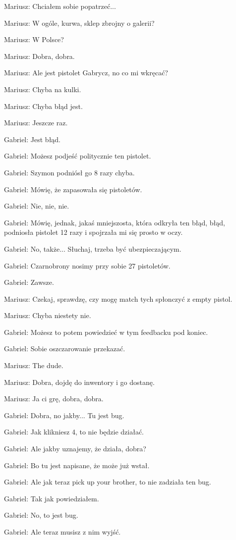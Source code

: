 Mariusz: Chciałem sobie popatrzeć...

Mariusz: W ogóle, kurwa, sklep zbrojny o galerii?

Mariusz: W Polsce?

Mariusz: Dobra, dobra.

Mariusz: Ale jest pistolet Gabrycz, no co mi wkręcać?

Mariusz: Chyba na kulki.

Mariusz: Chyba błąd jest.

Mariusz: Jeszcze raz.

Gabriel: Jest błąd.

Gabriel: Możesz podjeść politycznie ten pistolet.

Gabriel: Szymon podniósł go 8 razy chyba.

Gabriel: Mówię, że zapasowała się pistoletów.

Gabriel: Nie, nie, nie.

Gabriel: Mówię, jednak, jakaś mniejszosta, która odkryła ten błąd, błąd, podniosła pistolet 12 razy i spojrzała mi się prosto w oczy.

Gabriel: No, także... Słuchaj, trzeba być ubezpieczającym.

Gabriel: Czarnobrony nosimy przy sobie 27 pistoletów.

Gabriel: Zawsze.

Mariusz: Czekaj, sprawdzę, czy mogę match tych spłonczyć z empty pistol.

Mariusz: Chyba niestety nie.

Gabriel: Możesz to potem powiedzieć w tym feedbacku pod koniec.

Gabriel: Sobie oszczarowanie przekazać.

Mariusz: The dude.

Mariusz: Dobra, dojdę do inwentory i go dostanę.

Mariusz: Ja ci grę, dobra, dobra.

Gabriel: Dobra, no jakby... Tu jest bug.

Gabriel: Jak klikniesz 4, to nie będzie działać.

Gabriel: Ale jakby uznajemy, że działa, dobra?

Gabriel: Bo tu jest napisane, że może już wstał.

Gabriel: Ale jak teraz pick up your brother, to nie zadziała ten bug.

Gabriel: Tak jak powiedziałem.

Gabriel: No, to jest bug.

Gabriel: Ale teraz musisz z nim wyjść.

